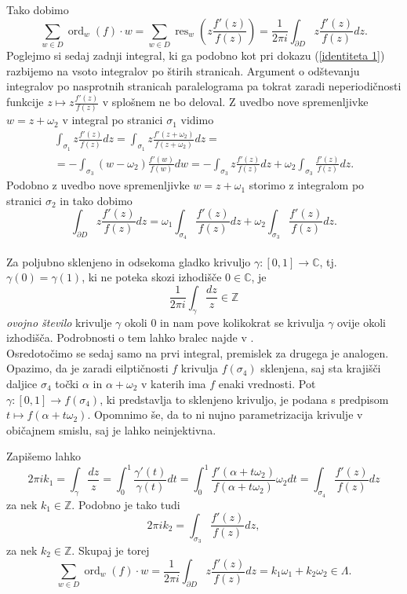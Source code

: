 \documentclass[mat1]{fmfdelo}
\numberwithin{equation}{section}
\newcommand{\Z}{\mathbb Z}
\newcommand{\C}{\mathbb C}
\newcommand{\res}[2]{\operatorname{res}_{#1}(#2)}
\newcommand{\ord}[2]{\operatorname{ord}_{#1}(#2)}
\theoremstyle{definition}
\begin{document}
\begin{dokaz}
\[        %
    \]
    Tako dobimo 
    \[
        \sum_{w \in D} \ord{w}{f}\cdot w 
        = \sum_{w \in D} \operatorname{res}_{w} \left( z \frac{f'(z)}{f(z)} \right)
        = \frac{1}{2 \pi i} \int_{\partial D} z \frac{f'(z)}{f(z)}dz. 
    \] 
    Poglejmo si sedaj zadnji integral, ki ga podobno kot pri dokazu (\ref{identiteta 1}) razbijemo na vsoto integralov po štirih stranicah. Argument o odštevanju integralov po nasprotnih stranicah paralelograma pa tokrat zaradi neperiodičnosti funkcije $z \mapsto z \frac{f'(z)}{f(z)}$ v splošnem ne bo deloval. Z uvedbo nove spremenljivke $w = z + \omega_2$ v integral po stranici $\sigma_1$ vidimo
    \begin{multline*}
        \int_{\sigma_1} z \frac{f'(z)}{f(z)}dz = 
        \int_{\sigma_1} z \frac{f'(z + \omega_2)}{f(z + \omega_2)}dz = \\ = 
        - \int_{\sigma_3} (w - \omega_2) \frac{f'(w)}{f(w)}dw = 
        - \int_{\sigma_3} z \frac{f'(z)}{f(z)}dz + \omega_2 \int_{\sigma_3} \frac{f'(z)}{f(z)}dz.
    \end{multline*}
    Podobno z uvedbo nove spremenljivke $w = z + \omega_1$ storimo z integralom po stranici $\sigma_2$ in tako dobimo
    \[
        \int_{\partial D} z \frac{f'(z)}{f(z)}dz = \omega_1 \int_{\sigma_4} \frac{f'(z)}{f(z)}dz + \omega_2 \int_{\sigma_3} \frac{f'(z)}{f(z)}dz.
    \]
    \\

    Za poljubno sklenjeno in odsekoma gladko krivuljo $\gamma : [0,1] \to \C$, tj. $\gamma(0) = \gamma(1)$, ki ne poteka skozi izhodišče $0\in \C$, je
    \[
        \frac{1}{2 \pi i} \int_\gamma \frac{dz}{z} \in \Z
    \]
    \emph{ovojno število} krivulje $\gamma$ okoli $0$ in nam pove kolikokrat se krivulja $\gamma$ ovije okoli izhodišča. Podrobnosti o tem lahko bralec najde v \cite[4.2.1.]{Ahlfors}.
    \\

    Osredotočimo se sedaj samo na prvi integral, premislek za drugega je analogen. Opazimo, da je zaradi eilptičnosti $f$ krivulja $f(\sigma_4)$ sklenjena, saj sta krajišči daljice $\sigma_4$ točki $\alpha$ in $\alpha + \omega_2$ v katerih ima $f$ enaki vrednosti. Pot $\gamma : [0,1] \to f(\sigma_4)$, ki predstavlja to sklenjeno krivuljo, je podana s predpisom $t \mapsto f(\alpha + t\omega_2)$. Opomnimo še, da to ni nujno parametrizacija krivulje v običajnem smislu, saj je lahko neinjektivna. 
    
    Zapišemo lahko 
    \[
        2 \pi i k_1 = 
        \int_{\gamma} \frac{dz}{z} = 
        \int_0^1 \frac{\gamma'(t)}{\gamma(t)}dt =
        \int_0^1 \frac{f'(\alpha + t\omega_2)}{f(\alpha + t\omega_2)}\omega_2 dt = 
        \int_{\sigma_4} \frac{f'(z)}{f(z)}dz
    \]
    za nek $k_1 \in \Z$. Podobno je tako tudi
    \[
        2 \pi i k_2 = \int_{\sigma_3} \frac{f'(z)}{f(z)}dz,
    \]
    za nek $k_2 \in \Z$. Skupaj je torej 
    \[
        \sum_{w \in D} \ord{w}{f} \cdot w = 
        \frac{1}{2 \pi i} \int_{\partial D} z\frac{f'(z)}{f(z)}dz = 
        k_1 \omega_1 + k_2 \omega_2\in \Lambda.  
    \]
\end{dokaz}
\end{document}
